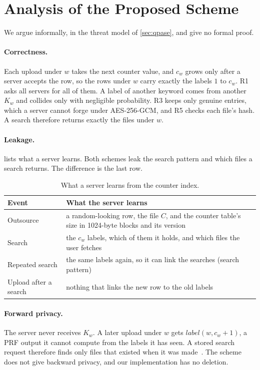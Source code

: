 \section{Analysis of the Proposed Scheme}
\label{sec:counter-analysis}

We argue informally, in the threat model of \cref{sec:qpase}, and give no formal proof.

\paragraph{Correctness.} Each upload under $w$ takes the next counter value, and $c_w$ grows only after a server
accepts the row, so the rows under $w$ carry exactly the labels $1$ to $c_w$. R1 asks all servers for all of them.
A label of another keyword comes from another $K_w$ and collides only with negligible probability. R3 keeps only
genuine entries, which a server cannot forge under AES-256-GCM, and R5 checks each file's hash. A search therefore
returns exactly the files under $w$.

\paragraph{Leakage.}  lists what a server learns. Both schemes leak the search pattern and
which files a search returns. The difference is the last row.

\begin{table}[ht]
\centering
\small
\caption{What a server learns from the counter index.}
\label{tab:ci-leakage}
\begin{tabularx}{\linewidth}{lX}
\toprule
\textbf{Event} & \textbf{What the server learns} \\
\midrule
Outsource & a random-looking row, the file $C$, and the counter table's size in 1024-byte blocks and its version \\
Search & the $c_w$ labels, which of them it holds, and which files the user fetches \\
Repeated search & the same labels again, so it can link the searches (search pattern) \\
Upload after a search & nothing that links the new row to the old labels \\
\bottomrule
\end{tabularx}
\end{table}

\paragraph{Forward privacy.} The server never receives $K_w$. A later upload under $w$ gets
$\mathit{label}(w, c_w + 1)$, a PRF output it cannot compute from the labels it has seen. A stored search request
therefore finds only files that existed when it was made~\cite{stefanov2014practical}. The scheme does not give
backward privacy, and our implementation has no deletion.

